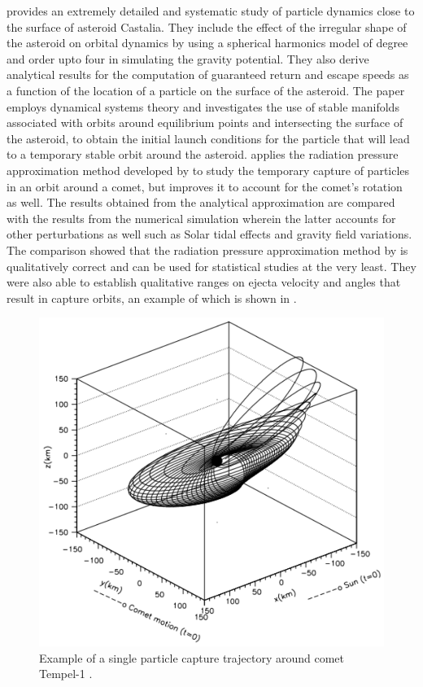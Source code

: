 %
\newline\newline
%
\cite{scheeres1996orbits} provides an extremely detailed and systematic study of particle dynamics close to the surface of asteroid Castalia. They include the effect of the irregular shape of the asteroid on orbital dynamics by using a spherical harmonics model of degree and order upto four in simulating the gravity potential. They also derive analytical results for the computation of guaranteed return and escape speeds as a function of the location of a particle on the surface of the asteroid. The paper employs dynamical systems theory and investigates the use of stable manifolds associated with orbits around equilibrium points and intersecting the surface of the asteroid, to obtain the initial launch conditions for the particle that will lead to a temporary stable orbit around the asteroid. \cite{scheeres2000ejecta} applies the radiation pressure approximation method developed by \cite{richter1995stability} to study the temporary capture of particles in an orbit around a comet, but improves it to account for the comet's rotation as well. The results obtained from the analytical approximation are compared with the results from the numerical simulation wherein the latter accounts for other perturbations as well such as Solar tidal effects and gravity field variations. The comparison showed that the radiation pressure approximation method by \cite{richter1995stability} is qualitatively correct and can be used for statistical studies at the very least. They were also able to establish qualitative ranges on ejecta velocity and angles that result in capture orbits, an example of which is shown in .
\begin{figure}[htb]
\centering
\captionsetup{justification=centering}
\includegraphics[width=\linewidth, height=0.4\textheight, keepaspectratio=true]{capture_orbit_tempel1_scheeres.pdf}
\caption{Example of a single particle capture trajectory around comet Tempel-1 \parencite{scheeres2000ejecta}.}
\label{fig:comet_temporary_capture_example}
\end{figure}
